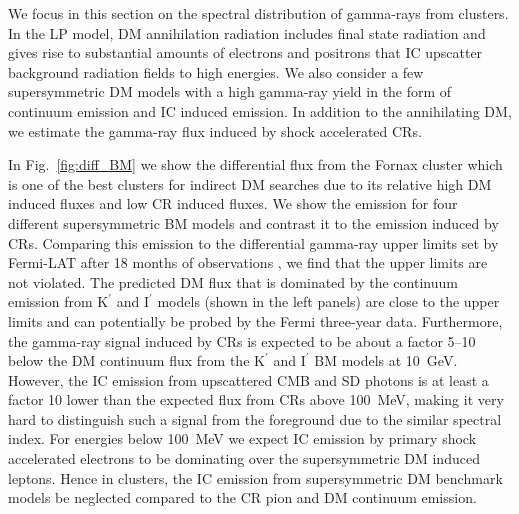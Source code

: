 \documentclass[10pt,aps,pra,reprint,amsmath,amsfonts,amssymb,showpacs,nofootinbib,floatfix]{revtex4-1}
\newcommand{\rmn}{\mathrm}
\newcommand{\Kp}{\rmn{K}^\prime}
\newcommand{\Ip}{\rmn{I}^\prime}
\begin{document}
We focus in this section on the spectral distribution of gamma-rays
from clusters.  In the LP model, DM annihilation radiation includes
final state radiation and gives rise to substantial amounts of
electrons and positrons that IC upscatter background radiation fields
to high energies. We also consider a few supersymmetric DM models with
a high gamma-ray yield in the form of continuum emission and IC
induced emission. In addition to the annihilating DM, we estimate the
gamma-ray flux induced by shock accelerated CRs.

In Fig.~\ref{fig:diff_BM} we show the differential flux from the
Fornax cluster which is one of the best clusters for indirect DM
searches due to its relative high DM induced fluxes and low CR induced
fluxes. We show the emission for four different supersymmetric BM
models and contrast it to the emission induced by CRs. Comparing this
emission to the differential gamma-ray upper limits set by Fermi-LAT
after 18 months of observations \cite{2010ApJ...717L..71A}, 
we find
that the upper limits are not violated. The predicted DM flux that is
dominated by the continuum emission from $\Kp$ and $\Ip$ models (shown
in the left panels) are close to the upper limits and can potentially
be probed by the Fermi three-year data. Furthermore, the gamma-ray
signal induced by CRs is expected to be about a factor 5--10 below
the DM continuum flux from the $\Kp$ and $\Ip$ BM models at
10~GeV. However, the IC emission from upscattered CMB and SD photons
is at least a factor 10 lower than the expected flux from CRs above
100~MeV, making it very hard to distinguish such a signal from the
foreground due to the similar spectral index. For energies below
100~MeV we expect IC emission by primary shock accelerated electrons
to be dominating \cite{2010MNRAS.409..449P} over the supersymmetric DM
induced leptons. Hence in clusters, the IC emission from
supersymmetric DM benchmark models be  neglected compared to the
CR pion and DM continuum emission.
\end{document}

